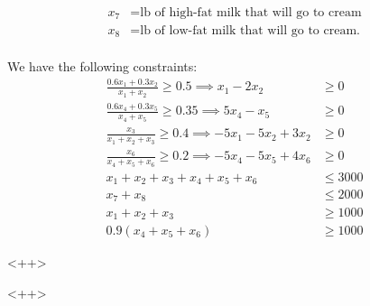 \documentclass{article}
\begin{document}
\begin{enumerate}
\begin{align*}
			x_7 &= \text{lb of high-fat milk that will go to cream} \\
			x_8 &= \text{lb of low-fat milk that will go to cream.} \\
		\end{align*}
		\begin{soln}
			We have the following constraints:
			\begin{align*}
				\frac{0.6x_1+0.3x_2}{x_1+x_2} \ge 0.5 \implies x_1-2x_2 &\ge 0 \\
				\frac{0.6x_4+0.3x_5}{x_4+x_5} \ge 0.35 \implies 5x_4-x_5 &\ge 0 \\
				\frac{x_3}{x_1+x_2+x_3} \ge 0.4 \implies -5x_1-5x_2+3x_2 &\ge 0 \\
				\frac{x_6}{x_4+x_5+x_6} \ge 0.2 \implies -5x_4-5x_5+4x_6 &\ge 0 \\
				x_1+x_2+x_3+x_4+x_5+x_6 &\le 3000 \\
				x_7+x_8 &\le 2000 \\
				x_1+x_2+x_3 &\ge 1000 \\
				0.9(x_4+x_5+x_6) &\ge 1000
			\end{align*}
		\end{soln}<++>

\end{enumerate}<++>
\end{document}
